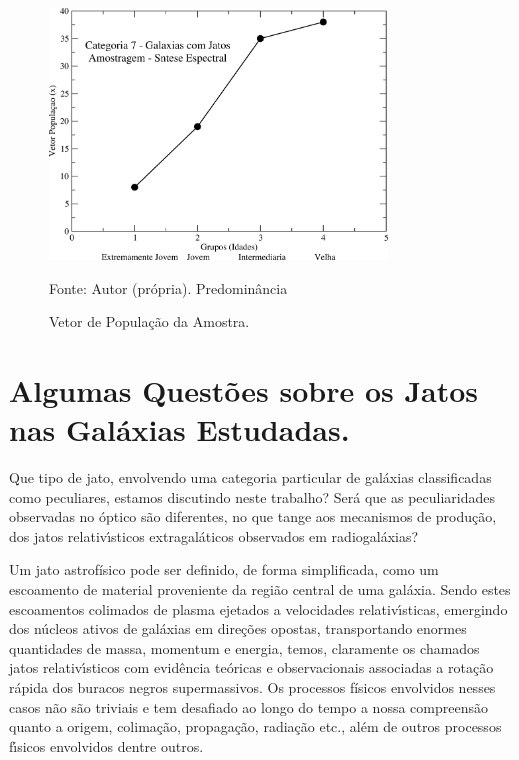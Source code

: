 \begin{figure}[H]
	\centering	
    \caption{Vetor de População da Amostra.}
    \includegraphics[width=0.8\textwidth]{figuras/vetorpop.jpg}
   	\begin{center}
        \normalsize Fonte: Autor (própria). Predominância %
    \end{center}
	\label{fig:sbmt-moses}
\end{figure}

\section{Algumas Questões sobre os Jatos nas Galáxias Estudadas.} 

Que tipo de jato, envolvendo uma categoria particular de galáxias classificadas como peculiares, estamos discutindo neste trabalho? Será que as peculiaridades observadas no óptico são diferentes, no que tange aos mecanismos de produção, dos jatos relativı́sticos extragaláticos observados em radiogaláxias?

Um jato astrofísico pode ser definido, de forma simplificada, como um escoamento de material proveniente da região central de uma galáxia. Sendo estes escoamentos colimados de plasma ejetados a velocidades relativı́sticas, emergindo dos núcleos ativos de galáxias em direções opostas, transportando enormes quantidades de massa, momentum e energia, temos, claramente os chamados jatos relativı́sticos com evidência teóricas e observacionais associadas a rotação rápida dos buracos negros supermassivos. Os processos físicos envolvidos nesses casos não são triviais e tem desafiado ao longo do tempo a nossa compreensão quanto a origem, colimação, propagação, radiação etc., além de outros processos fı́sicos envolvidos \cite{begelman1984theory, ferrari1998modeling, blandford1990physical, krolik1999active, meier2001magnetohydrodynamic, collin2006quasars} dentre outros. %

